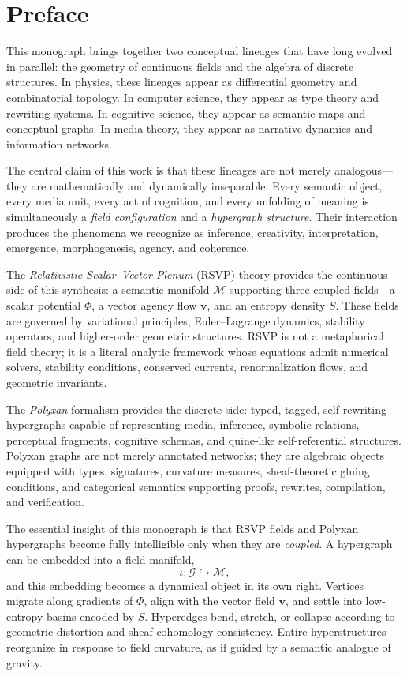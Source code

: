 \chapter*{Preface}

\noindent
This monograph brings together two conceptual lineages that have long
evolved in parallel: the geometry of continuous fields and the algebra
of discrete structures. In physics, these lineages appear as differential
geometry and combinatorial topology. In computer science, they appear as
type theory and rewriting systems. In cognitive science, they appear as
semantic maps and conceptual graphs. In media theory, they appear as
narrative dynamics and information networks.

The central claim of this work is that these lineages are not merely
analogous---they are mathematically and dynamically inseparable.  
Every semantic object, every media unit, every act of cognition, and
every unfolding of meaning is simultaneously a \emph{field configuration}
and a \emph{hypergraph structure}. Their interaction produces the
phenomena we recognize as inference, creativity, interpretation,
emergence, morphogenesis, agency, and coherence.

The \emph{Relativistic Scalar--Vector Plenum} (RSVP) theory provides the
continuous side of this synthesis: a semantic manifold \( \mathcal{M} \)
supporting three coupled fields---a scalar potential \( \Phi \), a vector
agency flow \( \mathbf{v} \), and an entropy density \( S \). These fields
are governed by variational principles, Euler--Lagrange dynamics,
stability operators, and higher-order geometric structures. RSVP is not
a metaphorical field theory; it is a literal analytic framework whose
equations admit numerical solvers, stability conditions, conserved
currents, renormalization flows, and geometric invariants.

The \emph{Polyxan} formalism provides the discrete side: typed,
tagged, self-rewriting hypergraphs capable of representing media,
inference, symbolic relations, perceptual fragments, cognitive schemas,
and quine-like self-referential structures. Polyxan graphs are not
merely annotated networks; they are algebraic objects equipped with
types, signatures, curvature measures, sheaf-theoretic gluing
conditions, and categorical semantics supporting proofs, rewrites,
compilation, and verification.

The essential insight of this monograph is that RSVP fields and Polyxan
hypergraphs become fully intelligible only when they are \emph{coupled}.
A hypergraph can be embedded into a field manifold,
\[
  \iota : \mathcal{G} \hookrightarrow \mathcal{M},
\]
and this embedding becomes a dynamical object in its own right.  
Vertices migrate along gradients of \( \Phi \), align with the vector
field \( \mathbf{v} \), and settle into low-entropy basins encoded by \( S \).
Hyperedges bend, stretch, or collapse according to geometric distortion
and sheaf-cohomology consistency. Entire hyperstructures reorganize in
response to field curvature, as if guided by a semantic analogue of
gravity.

